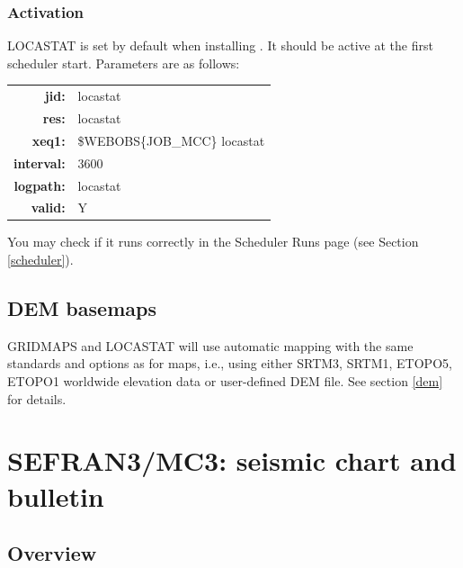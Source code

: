 


\subsubsection{Activation}

LOCASTAT is set by default when installing \webobs. It should be active at the first scheduler start. Parameters are as follows:

\begin{tabular}{rl}
\textbf{jid:}      & locastat \\
\textbf{res:}      & locastat \\
\textbf{xeq1:}     & \$WEBOBS\{JOB\_MCC\} locastat \\
\textbf{interval:} & 3600 \\
\textbf{logpath:}  & locastat \\
\textbf{valid:}    & Y \\
\end{tabular}

You may check if it runs correctly in the Scheduler Runs page (see Section \ref{scheduler}).

\subsection{DEM basemaps}

GRIDMAPS and LOCASTAT will use automatic mapping with the same standards and options as for  maps, i.e., using either SRTM3, SRTM1, ETOPO5, ETOPO1 worldwide elevation data or user-defined DEM file. See section \ref{dem} for details.


\newpage
\section{SEFRAN3/MC3: seismic chart and bulletin}

\subsection{Overview}

